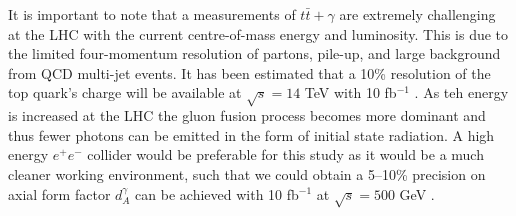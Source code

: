 It is important to note that a measurements of $t\bar{t}+\gamma$ are extremely challenging at the LHC with the current centre-of-mass energy 
and luminosity. This is due to the limited four-momentum resolution of partons, pile-up, and large background from QCD multi-jet events. It has 
been estimated that a 10\% resolution of the top quark's charge will be available at $\sqrt{s} = 14$ TeV with 10 fb$^{-1}$ \cite{
topchargemeasurement}. As teh energy is increased at the LHC the gluon fusion process becomes more dominant and thus fewer photons can be 
emitted in the form of initial state radiation. A high energy $e^+e^-$ collider would be preferable for this study as it would be a much 
cleaner working environment, such that we could obtain a 5--10\% precision on axial form factor $d^{\gamma}_A$ can be achieved with 10 fb$^{-1}$
at $\sqrt{s} = 500$ GeV \cite{linearcollider}.
